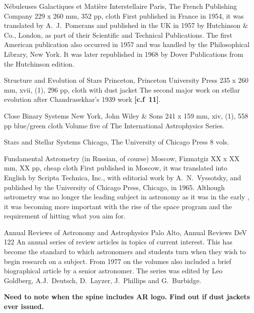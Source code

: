 {N\'{e}buleuses Galactiques et Mati\`{e}re Interstellaire}
{Paris, The French Publishing Company}
{229 x 260 mm, 352 pp, cloth}
{}
First published in France in 1954, it was translated by A.\ J.\ Pomerans
and published in the UK in 1957 by Hutchinson \& Co., London, as part of their Scientific and 
Technical Publications.  The first American publication also occurred in 1957 and was 
handled by the Philosophical Library, New York. It was later republished in 1968 by Dover
Publications from the Hutchinson edition.

{Structure and Evolution of Stars}
{Princeton, Princeton University Press}
{235 x 260 mm, xvii, (1), 296 pp, cloth with dust jacket}
{}
The second major work on stellar evolution after Chandrasekhar's 1939 work {\bf [c.f\ 11]}.

{Close Binary Systems}
{New York, John Wiley \& Sons}
{241 x 159 mm, xiv, (1), 558 pp blue/green cloth}
{}
Volume five of The International Astrophysics Series.

{Stars and Stellar Systems}
{Chicago, The University of Chicago Press}
{8 vols.}
{}

{Fundamental Astrometry (in Russian, of course)}
{Moscow, Fizmatgiz}
{XX x XX mm, XX pp, cheap cloth}
{}
First published in Moscow, it was translated into English by Scripta
Technica, Inc., with editorial work by A.\ N.\ Vyssotsky, and published
by the University of Chicago Press, Chicago, in 1965.  Although astrometry
was no longer the leading subject in astronomy as it was in the early ,
it was becoming more important with the rise of the space program and the requirement
of hitting what you aim for.

{Annual Reviews of Astronomy and Astrophysics}
{Palo Alto, Annual Reviews}
{}
{DeV 122}
An annual series of review articles in topics of current interest.  This has become
the standard to which astronomers and students turn when they wish to
begin research on a subject.  From 1977 on the volumes also included a brief biographical
article by a senior astronomer. The series was edited by Leo Goldberg, A.J.\ Deutsch,
D.\ Layzer, J.\ Phillips and G.\ Burbidge.

\textbf{Need to note when the spine includes AR logo. Find out if dust jackets ever issued.}


